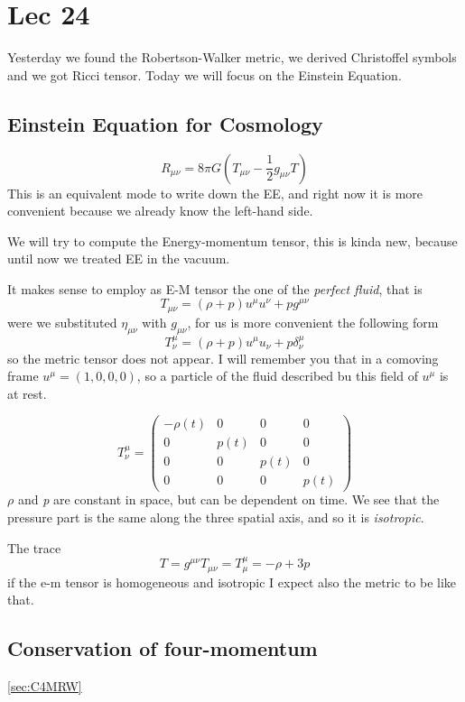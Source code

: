 \section{Lec 24}
Yesterday we found the Robertson-Walker metric, we derived Christoffel symbols and we got Ricci tensor. Today we will focus on the Einstein Equation.
\subsection{Einstein Equation for Cosmology}\label{sec:energydensityrelRW}
\[
R_{\mu \nu } = 8\pi G \left( T_{\mu \nu } - \frac{1}{2}g_{\mu \nu }T \right)
\]
This is an equivalent mode to write down the EE, and right now it is more convenient because we already know the left-hand side. \par
We will try to compute the Energy-momentum tensor, this is kinda new, because until now we treated EE in the vacuum.

It makes sense to employ as E-M tensor the one of the \emph{perfect fluid},  that is
\[
T_{\mu \nu } = \left( \rho +p \right)u^{\mu }u^{\nu }+ pg^{\mu \nu }
\]
were we substituted $\eta _{\mu \nu }$ with $g_{\mu \nu }$,  for us is more convenient the following form
\[
T^{\mu }_{\nu } = \left( \rho +p \right)u^{\mu }u_{\nu }+ p \delta ^{\mu }_{\nu }
\]
so the metric tensor does not appear.
I will remember you that in a comoving frame $u^{\mu } = \left( 1,0,0,0 \right)	$, so a particle of the fluid described bu this field of $u^{\mu }$ is at rest.	\par
\[
T^{\mu }_{\nu } = \begin{pmatrix}
-\rho \left( t \right) & 0 & 0 & 0 \\
0 & p\left( t \right) & 0 & 0 \\
0 & 0 & p\left( t \right) & 0 \\
0 & 0 & 0 & p\left( t \right)
\end{pmatrix} 
\]
$\rho $ and \emph{p} are constant in space, but can be dependent on time. We see that the pressure part is the same along the three spatial axis, and so it is \emph{isotropic}. \par
The trace
\[
T = g^{\mu \nu }T_{\mu \nu }= T^{\mu }_{\mu }=-\rho +3p
\]
if the e-m tensor is homogeneous and isotropic I expect also the metric to be like that.\par

\subsection{Conservation of four-momentum}\ref{sec:C4MRW}

